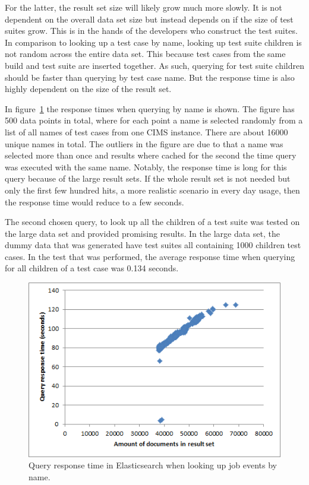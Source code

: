 For the latter, the result set size will likely grow much more slowly. It is not dependent on the overall data set size but instead depends on if the size of test suites grow. This is in the hands of the developers who construct the test suites. In comparison to looking up a test case by name, looking up test suite children is not random across the entire data set. This because test cases from the same build and test suite are inserted together. As such, querying for test suite children should be faster than querying by test case name. But the response time is also highly dependent on the size of the result set.

In figure~\ref{fig:query_by_name} the response times when querying by name is shown. The figure has 500 data points in total, where for each point a name is selected randomly from a list of all names of test cases from one CIMS instance. There are about 16000 unique names in total. The outliers in the figure are due to that a name was selected more than once and results where cached for the second the time query was executed with the same name. Notably, the response time is long for this query because of the large result sets. If the whole result set is not needed but only the first few hundred hits, a more realistic scenario in every day usage, then the response time would reduce to a few seconds.

The second chosen query, to look up all the children of a test suite was tested on the large data set and provided promising results. In the large data set, the dummy data that was generated have test suites all containing 1000 children test cases. In the test that was performed, the average response time when querying for all children of a test case was 0.134 seconds.

\begin{figure}[h!]
\centering
\includegraphics[]{figure/query_by_name.png}
\caption{Query response time in Elasticsearch when looking up job events by name.}
\label{fig:query_by_name}
\end{figure}

